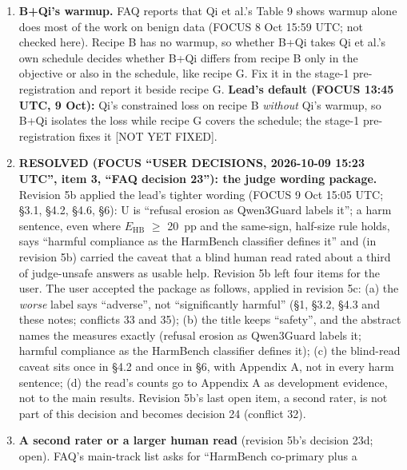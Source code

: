 \documentclass{article}
\theoremstyle{plain}
\theoremstyle{definition}
\theoremstyle{remark}
\begin{document}
\begin{enumerate}
        ($E_{\mathrm{common}}$ is the recipe-B Gate A mean, +45.1~pp), so it
        repeats the primary floor; revision 5 drops the sentence from \S{}4.6.
        Confirm, or restore it if DRAFT revision 5 keeps it.
  \item \textbf{B+Qi's warmup.} FAQ reports that Qi et al.'s Table 9 shows
        warmup alone does most of the work on benign data (FOCUS 8 Oct 15:59
        UTC; not checked here). Recipe B has no warmup, so whether B+Qi takes Qi
        et al.'s own schedule decides whether B+Qi differs from recipe B only in
        the objective or also in the schedule, like recipe G. Fix it in the
        stage-1 pre-registration and report it beside recipe G. \textbf{Lead's
        default (FOCUS 13:45 UTC, 9 Oct):} Qi's constrained loss on recipe B
        \emph{without} Qi's warmup, so B+Qi isolates the loss while recipe G
        covers the schedule; the stage-1 pre-registration fixes it [NOT YET
        FIXED].
  \item \textbf{RESOLVED (FOCUS ``USER DECISIONS, 2026-10-09 15:23 UTC'', item
        3, ``FAQ decision 23''): the judge wording package.} Revision 5b applied
        the lead's tighter wording (FOCUS 9 Oct 15:05 UTC; \S{}3.1, \S{}4.2,
        \S{}4.6, \S{}6): U is ``refusal erosion as Qwen3Guard labels it''; a
        harm sentence, even where $E_{\mathrm{HB}}$ $\ge$ 20~pp and the
        same-sign, half-size rule holds, says ``harmful compliance as the
        HarmBench classifier defines it'' and (in revision 5b) carried the
        caveat that a blind human read rated about a third of judge-unsafe
        answers as usable help. Revision 5b left four items for the user. The
        user accepted the package as follows, applied in revision 5c: (a) the
        \emph{worse} label says ``adverse'', not ``significantly harmful''
        (\S{}1, \S{}3.2, \S{}4.3 and these notes; conflicts 33 and 35); (b) the
        title keeps ``safety'', and the abstract names the measures exactly
        (refusal erosion as Qwen3Guard labels it; harmful compliance as the
        HarmBench classifier defines it); (c) the blind-read caveat sits once in
        \S{}4.2 and once in \S{}6, with Appendix A, not in every harm sentence;
        (d) the read's counts go to Appendix A as development evidence, not to
        the main results. Revision 5b's last open item, a second rater, is not
        part of this decision and becomes decision 24 (conflict 32).
  \item \textbf{A second rater or a larger human read} (revision 5b's decision
        23d; open). FAQ's main-track list asks for ``HarmBench co-primary plus a

\end{enumerate}
\end{document}
